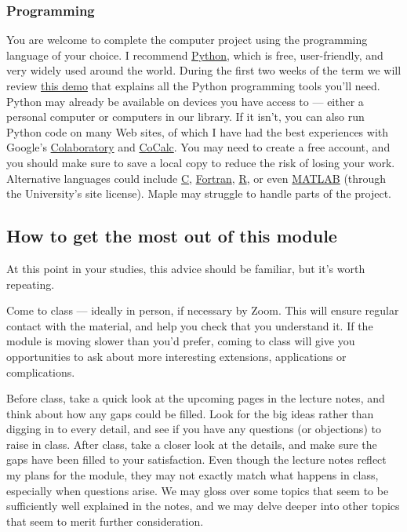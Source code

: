 \subsubsection*{Programming}
You are welcome to complete the computer project using the programming language of your choice.
I recommend \href{https://www.python.org}{Python}, which is free, user-friendly, and very widely used around the world.
During the first two weeks of the term we will review \href{https://tinyurl.com/math327demo}{this demo} that explains all the Python programming tools you'll need.
Python may already be available on devices you have access to --- either a personal computer or computers in our library.
If it isn't, you can also run Python code on many Web sites, of which I have had the best experiences with Google's \href{https://colab.research.google.com}{Colaboratory} and \href{https://cocalc.com}{CoCalc}. %
You may need to create a free account, and you should make sure to save a local copy to reduce the risk of losing your work.
Alternative languages could include \href{https://en.wikipedia.org/wiki/C_(programming_language)}{C}, \href{https://fortran-lang.org}{Fortran}, \href{https://www.r-project.org}{R}, or even \href{https://matlab.mathworks.com}{MATLAB} (through the University's site license).
Maple may struggle to handle parts of the project.



\subsection*{How to get the most out of this module}
At this point in your studies, this advice should be familiar, but it's worth repeating.

Come to class --- ideally in person, if necessary by Zoom.
This will ensure regular contact with the material, and help you check that you understand it.
If the module is moving slower than you'd prefer, coming to class will give you opportunities to ask about more interesting extensions, applications or complications.

Before class, take a quick look at the upcoming pages in the lecture notes, and think about how any gaps could be filled.
Look for the big ideas rather than digging in to every detail, and see if you have any questions (or objections) to raise in class.
After class, take a closer look at the details, and make sure the gaps have been filled to your satisfaction.
Even though the lecture notes reflect my plans for the module, they may not exactly match what happens in class, especially when questions arise.
We may gloss over some topics that seem to be sufficiently well explained in the notes, and we may delve deeper into other topics that seem to merit further consideration.

